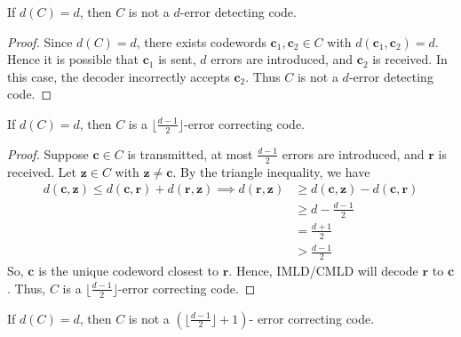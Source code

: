 \begin{thmbox}
    \begin{theorem}
        If $ d(C)=d $, then $ C $ is not a $ d $-error detecting code.
    \end{theorem} \end{thmbox}

\begin{proof}
    Since $ d(C)=d $, there exists codewords $ \bm{c}_1,\bm{c}_2\in C $
    with $ d(\bm{c}_1,\bm{c}_2)=d $. Hence it is possible that
    $ \bm{c}_1 $ is sent, $ d $ errors are introduced, and $ \bm{c}_2 $
    is received. In this case, the decoder incorrectly accepts
    $ \bm{c}_2 $. Thus $ C $ is not a $ d $-error detecting code.
\end{proof}

\begin{thmbox}
    \begin{theorem}
        If $ d(C)=d $, then $ C $ is a $ \lfloor \frac{d-1}{2} \rfloor $-error
        correcting code.
    \end{theorem} \end{thmbox}

\begin{proof}
    Suppose $ \bm{c}\in C $ is transmitted, at most $ \frac{d-1}{2}  $ errors
    are introduced, and $ \bm{r} $ is received.
    Let $ \bm{z}\in C $ with $ \bm{z}\neq \bm{c} $.
    By the triangle inequality, we have
    \begin{align*}
        d(\bm{c},\bm{z})\leqslant d(\bm{c},\bm{r})+d(\bm{r},\bm{z})\implies
        d(\bm{r},\bm{z})
         & \geqslant d(\bm{c},\bm{z})-d(\bm{c},\bm{r}) \\
         & \geqslant d-\frac{d-1}{2}                   \\
         & =\frac{d+1}{2}                              \\
         & >\frac{d-1}{2}
    \end{align*}
    So, $ \bm{c} $ is the unique codeword closest to $ \bm{r} $. Hence, IMLD/CMLD
    will decode $ \bm{r} $ to $ \bm{c} $. Thus, $ C $ is a
    $ \lfloor \frac{d-1}{2} \rfloor $-error correcting code.
\end{proof}

\begin{thmbox}
    \begin{theorem}
        If $ d(C)=d $, then $ C $ is not a $ \left( \lfloor \frac{d-1}{2}\rfloor +1 \right) $-
        error correcting code.
    \end{theorem} \end{thmbox}

